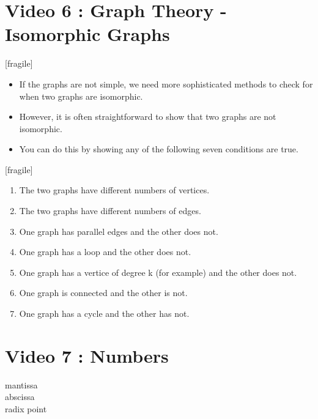 \documentclass[]{report}
\begin{document}
\section{Video 6 : Graph Theory - Isomorphic Graphs}
[fragile]
\begin{itemize}
	\item If the graphs are not simple, we need more sophisticated methods to check for when two graphs are isomorphic. 
	\item However, it is often straightforward to show that two graphs are not isomorphic. 
	\item You can do this by showing any of the following seven conditions are true.
\end{itemize}

[fragile]

\begin{enumerate}
	\item The two graphs have different numbers of vertices.
	\item The two graphs have different numbers of edges.
	\item One graph has parallel edges and the other does not.
	\item One graph has a loop and the other does not.
	\item One graph has a vertice of degree k (for example) and the other does not.
	\item One graph is connected and the other is not.
	\item One graph has a cycle and the other has not.
\end{enumerate}




\section{Video 7 : Numbers}

\Large

\begin{description}
	\item[mantissa]
	\item[abscissa]
	\item[radix point]
\end{description}
\end{document}
